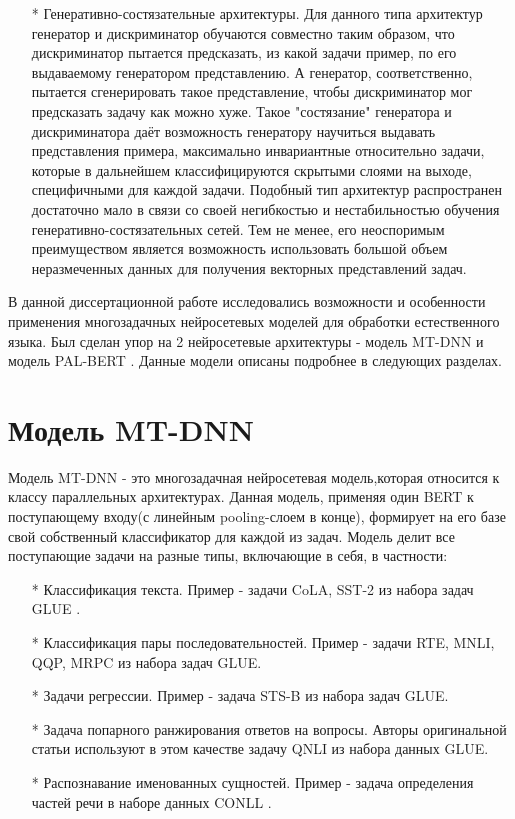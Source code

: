\begin{itemize}
\item[*] Генеративно-состязательные архитектуры. Для данного типа архитектур генератор и дискриминатор обучаются совместно таким образом, что дискриминатор пытается предсказать, из какой задачи пример, по его выдаваемому генератором представлению. А генератор, соответственно, пытается сгенерировать такое представление, чтобы дискриминатор мог предсказать задачу как можно хуже. Такое "состязание" генератора и дискриминатора даёт возможность генератору научиться выдавать представления примера, максимально инвариантные относительно задачи, которые в дальнейшем классифицируются скрытыми слоями на выходе, специфичными для каждой задачи. Подобный тип архитектур распространен достаточно мало в связи со своей негибкостью и нестабильностью обучения генеративно-состязательных сетей. Тем не менее, его неоспоримым преимуществом является возможность использовать большой объем неразмеченных данных для получения векторных представлений задач. 
\end{itemize}

В данной диссертационной работе исследовались возможности и особенности применения многозадачных нейросетевых моделей для обработки естественного языка. Был сделан упор на 2 нейросетевые архитектуры - модель MT-DNN \cite{Liu_He_Chen_Gao_2019} и модель PAL-BERT \cite{Stickland_Murray_2019}. Данные модели описаны подробнее в следующих разделах.

\section{Модель MT-DNN}
Модель MT-DNN - это многозадачная нейросетевая модель,которая относится к классу параллельных архитектурах. Данная модель, применяя один BERT к поступающему входу(с линейным pooling-слоем в конце), формирует на его базе свой собственный классификатор для каждой из задач. Модель делит все поступающие задачи на разные типы, включающие в себя, в частности:
\begin{itemize}
\item[*] Классификация текста. Пример - задачи CoLA, SST-2 из набора задач GLUE \cite{Wang_Singh_Michael_Hill_Levy_Bowman_2018}.
\item[*] Классификация пары последовательностей. Пример - задачи RTE, MNLI, QQP, MRPC из набора задач GLUE. 
\item[*] Задачи регрессии. Пример - задача STS-B из набора задач GLUE. 
\item[*] Задача попарного ранжирования ответов на вопросы. Авторы оригинальной статьи используют в этом качестве задачу QNLI из набора данных GLUE.
\item[*] Распознавание именованных сущностей. Пример - задача определения частей речи в наборе данных CONLL \cite{Erik F. Tjong Kim Sang_De Meulder_2003}. 
\end{itemize}

